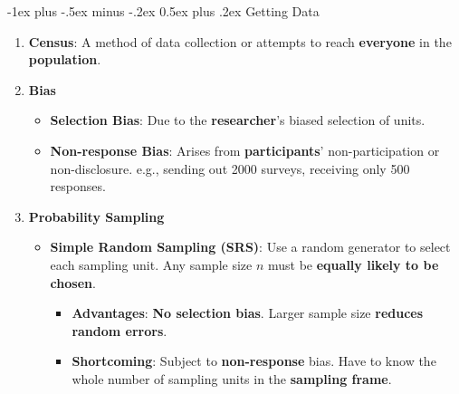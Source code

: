\documentclass[10pt, landscape]{article}
\makeatletter
\renewcommand{\section}{\@startsection{section}{1}{0mm}%
                                {-1ex plus -.5ex minus -.2ex}%
                                {0.5ex plus .2ex}%
                                {\normalfont\large\bfseries}}
\makeatother
\begin{document}
\raggedright
\footnotesize
\begin{multicols}{4}


\setlength{\columnseprule}{0.25pt}
\setlength{\premulticols}{1pt}
\setlength{\postmulticols}{1pt}
\setlength{\multicolsep}{1pt}
\setlength{\columnsep}{2pt}

\begin{center}
\end{center}
\section{Getting Data}
\begin{enumerate}
    \item \textbf{Census}: A method of data collection or attempts to reach \textbf{everyone} in the \textbf{population}.
    \item \textbf{Bias}
    \begin{itemize}
        \item \textbf{Selection Bias}: Due to the \textbf{researcher}’s biased selection of units.
        \item \textbf{Non-response Bias}: Arises from \textbf{participants}’ non-participation or non-disclosure. e.g., sending out 2000 surveys, receiving only 500 responses.
    \end{itemize}
    \item \textbf{Probability Sampling}
    \begin{itemize}
        \item \textbf{Simple Random Sampling (SRS)}: Use a random generator to select each sampling unit. Any sample size $n$ must be \textbf{equally likely to be chosen}.
        \begin{itemize}
            \item \textbf{Advantages}: \textbf{No selection bias}. Larger sample size \textbf{reduces random errors}. 
            \item \textbf{Shortcoming}: Subject to \textbf{non-response} bias. Have to know the whole number of sampling units in the \textbf{sampling frame}.
        \end{itemize}

\end{itemize}
\end{enumerate}
\end{multicols}
\end{document}
